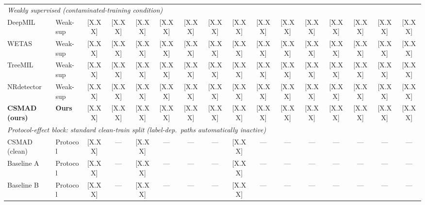 \begin{table}[t]
\begin{adjustbox}{max width=\linewidth}
\begin{tabular}{l@{\hspace{4pt}}l@{\hspace{3pt}}cccccccccccccc}
\midrule
\multicolumn{16}{l}{\textit{Weakly supervised (contaminated-training condition)}} \\
DeepMIL    & Weak-sup & {[X.XX]} & {[X.XX]} & {[X.XX]} & {[X.XX]} & {[X.XX]} & {[X.XX]} & {[X.XX]} & {[X.XX]} & {[X.XX]} & {[X.XX]} & {[X.XX]} & {[X.XX]} & {[X.XX]} & {[X.XX]} \\
WETAS      & Weak-sup & {[X.XX]} & {[X.XX]} & {[X.XX]} & {[X.XX]} & {[X.XX]} & {[X.XX]} & {[X.XX]} & {[X.XX]} & {[X.XX]} & {[X.XX]} & {[X.XX]} & {[X.XX]} & {[X.XX]} & {[X.XX]} \\
TreeMIL    & Weak-sup & {[X.XX]} & {[X.XX]} & {[X.XX]} & {[X.XX]} & {[X.XX]} & {[X.XX]} & {[X.XX]} & {[X.XX]} & {[X.XX]} & {[X.XX]} & {[X.XX]} & {[X.XX]} & {[X.XX]} & {[X.XX]} \\
NRdetector & Weak-sup & {[X.XX]} & {[X.XX]} & {[X.XX]} & {[X.XX]} & {[X.XX]} & {[X.XX]} & {[X.XX]} & {[X.XX]} & {[X.XX]} & {[X.XX]} & {[X.XX]} & {[X.XX]} & {[X.XX]} & {[X.XX]} \\
\midrule
\textbf{CSMAD (ours)} & \textbf{Ours} & {[X.XX]} & {[X.XX]} & {[X.XX]} & {[X.XX]} & {[X.XX]} & {[X.XX]} & {[X.XX]} & {[X.XX]} & {[X.XX]} & {[X.XX]} & {[X.XX]} & {[X.XX]} & {[X.XX]} & {[X.XX]} \\
\midrule
\multicolumn{16}{l}{\textit{Protocol-effect block: standard clean-train split (label-dep.\ paths automatically inactive)}} \\
CSMAD (clean)  & Protocol & {[X.XX]} & --- & {[X.XX]} & --- & --- & --- & {[X.XX]} & --- & --- & --- & --- & --- & --- & --- \\
Baseline A     & Protocol & {[X.XX]} & --- & {[X.XX]} & --- & --- & --- & {[X.XX]} & --- & --- & --- & --- & --- & --- & --- \\
Baseline B     & Protocol & {[X.XX]} & --- & {[X.XX]} & --- & --- & --- & {[X.XX]} & --- & --- & --- & --- & --- & --- & --- \\
\bottomrule
\end{tabular}
\end{adjustbox}
\end{table}

